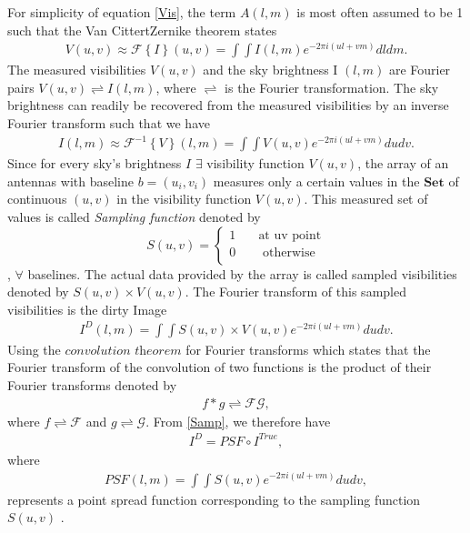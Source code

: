 For simplicity of equation \ref{Vis}, the term $A(l,m)$ is most often assumed to be 1 such that the Van CittertZernike theorem states \citep{thompson2017interferometry}
\begin{align}
V(u,v)\approx \mathcal{F}\left\{I\right\}(u,v)=\int \int I (l,m)e^{-2\pi i(ul+vm)} dl dm.
\label{V}
\end{align}
The measured visibilities $V(u,v)$ and the sky brightness I $(l,m)$ are Fourier pairs $V(u,v) \rightleftharpoons I(l,m)$, where $\rightleftharpoons$ is the Fourier transformation. The sky
brightness can readily be recovered from the measured visibilities by an inverse Fourier transform such that we have 
\begin{align}
I(l,m)\approx \mathcal{F}^{-1}\left\{V\right\}(l,m)=\int \int V (u,v)e^{-2\pi i(ul+vm)} du dv .
\end{align}
Since for every sky's brightness $I$ $\exists$ visibility function $V(u,v)$, the array of an antennas with baseline $b=(u_i,v_i)$  measures only a certain values in the $\textbf{Set}$ of continuous  $(u,v)$ in the visibility function $V(u,v)$. This measured set of values is called \emph{Sampling function} denoted by \citep{taylor1999synthesis} \[ S(u,v) =
  \begin{cases}
    1   & \quad    \text{at uv point}\\
    0  & \quad  \text{ otherwise}\\
  \end{cases}
\], $\forall$ baselines. The actual data provided by the array is called  sampled visibilities denoted by  $S(u,v)\times V(u,v)$. The Fourier transform of this sampled visibilities is the dirty Image
\begin{align}
I^{D}(l,m)=\int \int S(u,v)\times V(u,v) e^{-2\pi i(ul+vm)} du dv.
\label{Samp}
\end{align} 
Using the $\textit{convolution theorem}$ for Fourier transforms which states that the Fourier transform of the convolution of two functions is the product of their Fourier transforms denoted by 
\begin{align}
f*g\rightleftharpoons \mathcal{F} \mathcal{G},
\end{align}
where $f\rightleftharpoons \mathcal{F}$ and $g\rightleftharpoons \mathcal{G}$.
From \ref{Samp}, we therefore have 
\begin{align}
I^{D}=PSF \circ I^{True},
\end{align}
where 
\begin{align}
PSF(l,m) = \int \int S(u,v)e^{-2\pi i(ul+vm)} du dv,
\end{align}
represents a point spread function  corresponding to the sampling function $S(u,v)$ \citep{taylor1999synthesis}.


